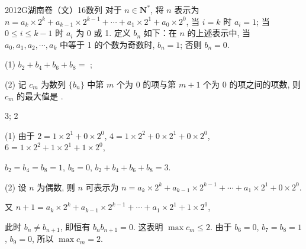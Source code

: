 
\begin{problem}{2012}{G}{湖南卷（文）}{16}{数列}
对于 $n \in \mathbf{N}^*$, 将 $n$ 表示为 $n=a_k \times 2^k + a_{k-1} \times 2^{k-1} + \cdots + a_1 \times 2^1 + a_0 \times 2^0$, 当 $i=k$ 时 $a_i=1$; 当 $0 \le i \le k-1$ 时 $a_i$ 为 0 或 1. 定义 $b_n$ 如下：在 $n$ 的上述表示中, 当 $a_0, a_1, a_2, \cdots, a_k$ 中等于 1 的个数为奇数时, $b_n=1$; 否则 $b_n=0$.

(1) $b_2+b_4+b_6+b_8=$ \underline{\hspace{4em}};

(2) 记 $c_m$ 为数列 $\{b_n\}$ 中第 $m$ 个为 0 的项与第 $m+1$ 个为 0 的项之间的项数, 则 $c_m$ 的最大值是 \underline{\hspace{4em}}.
\end{problem}

\begin{answer}
3; 2
\end{answer}

\begin{solutions}
(1) 由于 $2=1 \times 2^1 + 0 \times 2^0$, $4=1 \times 2^2 + 0 \times 2^1 + 0 \times 2^0$, $6=1 \times 2^2 + 1 \times 2^1 + 1 \times 2^0$,

$b_2=b_4=b_8=1$, $b_6=0$, $b_2+b_4+b_6+b_8=3$.

(2) 设 $n$ 为偶数, 则 $n$ 可表示为 $n=a_k \times 2^k + a_{k-1} \times 2^{k-1} + \cdots + a_1 \times 2^1 + 0 \times 2^0$.

又 $n+1=a_k \times 2^k + a_{k-1} \times 2^{k-1} + \cdots + a_1 \times 2^1 + 1 \times 2^0$, 

此时 $b_n \ne b_{n+1}$, 即恒有 $b_n b_{n+1}=0$. 这表明 $\max c_m \le 2$. 由于 $b_6=0$, $b_7=b_8=1$, $b_9=0$, 所以 $\max c_m=2$.
\end{solutions}